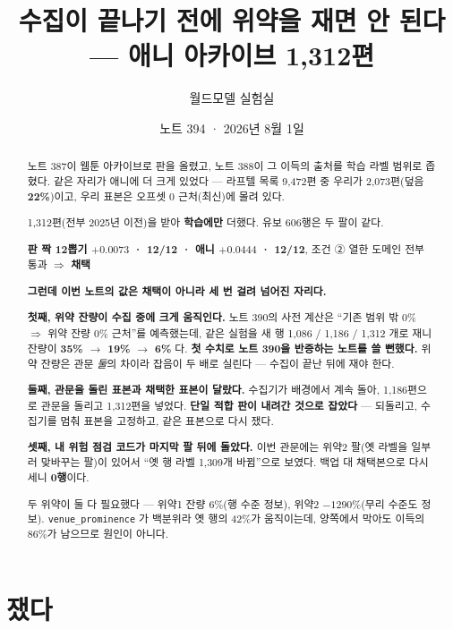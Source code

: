 \documentclass[11pt]{article}
\begin{document}
\title{수집이 끝나기 전에 위약을 재면 안 된다 --- 애니 아카이브 1,312편}
\author{월드모델 실험실}
\date{노트 394 · 2026년 8월 1일}
\maketitle

\begin{abstract}
노트 387이 웹툰 아카이브로 판을 올렸고, 노트 388이 그 이득의 출처를 학습
라벨 범위로 좁혔다. 같은 자리가 애니에 더 크게 있었다 --- 라프텔 목록
9,472편 중 우리가 2,073편(덮음 \textbf{22\%})이고, 우리 표본은 오프셋 0
근처(최신)에 몰려 있다.

1,312편(전부 2025년 이전)을 받아 \textbf{학습에만} 더했다. 유보 606행은
두 팔이 같다.

\begin{center}
\textbf{판 짝 12뽑기 $+0.0073$ · 12/12 · 애니 $+0.0444$ · 12/12}, 조건 ②
열한 도메인 전부 통과 $\Rightarrow$ \textbf{채택}
\end{center}

\textbf{그런데 이번 노트의 값은 채택이 아니라 세 번 걸려 넘어진 자리다.}

\textbf{첫째, 위약 잔량이 수집 중에 크게 움직인다.} 노트 390의 사전 계산은
``기존 범위 밖 0\% $\Rightarrow$ 위약 잔량 0\% 근처''를 예측했는데, 같은
실험을 새 행 1,086 / 1,186 / 1,312 개로 재니 잔량이
\textbf{35\% $\to$ 19\% $\to$ 6\%} 다. \textbf{첫 수치로 노트 390을
반증하는 노트를 쓸 뻔했다.} 위약 잔량은 관문 \emph{둘}의 차이라 잡음이
두 배로 실린다 --- 수집이 끝난 뒤에 재야 한다.

\textbf{둘째, 관문을 돌린 표본과 채택한 표본이 달랐다.} 수집기가 배경에서
계속 돌아, 1,186편으로 관문을 돌리고 1,312편을 넣었다. \textbf{단일 적합
판이 내려간 것으로 잡았다} --- 되돌리고, 수집기를 멈춰 표본을 고정하고,
같은 표본으로 다시 쟀다.

\textbf{셋째, 내 위험 점검 코드가 마지막 팔 뒤에 돌았다.} 이번 관문에는
위약2 팔(옛 라벨을 일부러 맞바꾸는 팔)이 있어서 ``옛 행 라벨 1,309개
바뀜''으로 보였다. 백업 대 채택본으로 다시 세니 \textbf{0행}이다.

두 위약이 둘 다 필요했다 --- 위약1 잔량 6\%(행 수준 정보), 위약2
$-1290$\%(무리 수준도 정보). \texttt{venue\_prominence} 가 백분위라 옛 행의
42\%가 움직이는데, 양쪽에서 막아도 이득의 86\%가 남으므로 원인이 아니다.
\end{abstract}

\section{쟀다}
\end{document}
